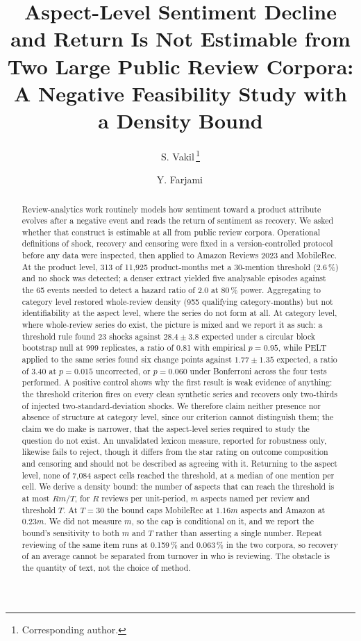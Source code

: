 \documentclass[11pt,a4paper]{article}
\title{Aspect-Level Sentiment Decline and Return Is Not Estimable from Two
Large Public Review Corpora: A Negative Feasibility Study with a Density Bound}
\author[1]{S. Vakil\,\orcidlink{0009-0009-1336-5045}\thanks{Corresponding author.}}
\author[1]{Y. Farjami\,\orcidlink{0000-0003-1908-8826}}
\affil[1]{Department of Computer Engineering, Faculty of Engineering,
University of Qom, Qom, Iran}
\date{}
\begin{document}
\maketitle

\begin{abstract}
\noindent
Review-analytics work routinely models how sentiment toward a product attribute
evolves after a negative event and reads the return of sentiment as recovery.
We asked whether that construct is estimable at all from public review corpora.
Operational definitions of shock, recovery and censoring were fixed in a
version-controlled protocol before any data were inspected, then applied to
Amazon Reviews 2023 and MobileRec. At the product level, 313 of 11{,}925
product-months met a 30-mention threshold (2.6\,\%) and no shock was detected;
a denser extract yielded five analysable episodes against the 65 events needed
to detect a hazard ratio of 2.0 at 80\,\% power. Aggregating to category level
restored whole-review density (955 qualifying category-months) but not
identifiability at the aspect level, where the series do not form at all. At
category level, where whole-review series do exist, the picture is mixed and we
report it as such: a threshold rule found 23 shocks against $28.4 \pm 3.8$
expected under a circular block bootstrap null at 999 replicates, a ratio of
0.81 with empirical $p = 0.95$, while PELT applied to the same series found six
change points against $1.77 \pm 1.35$ expected, a ratio of 3.40 at $p = 0.015$
uncorrected, or $p = 0.060$ under Bonferroni across the four tests performed. A
positive control shows why the first result is weak evidence of anything: the
threshold criterion fires on every clean synthetic series and recovers only
two-thirds of injected two-standard-deviation shocks. We therefore claim
neither presence nor absence of structure at category level, since our
criterion cannot distinguish them; the claim we do make is narrower, that the
aspect-level series required to study the question do not exist. An unvalidated lexicon measure, reported for
robustness only, likewise fails to reject, though it differs from the star
rating on outcome composition and censoring and should not be described as
agreeing with it. Returning to the aspect level, none of 7{,}084 aspect cells reached
the threshold, at a median of one mention per cell. We derive a density bound: the number of aspects that can reach the threshold
is at most $Rm/T$, for $R$ reviews per unit-period, $m$ aspects named per review
and threshold $T$. At $T = 30$ the bound caps MobileRec at $1.16m$ aspects and
Amazon at $0.23m$. We did not measure $m$, so the cap is conditional on it, and
we report the bound's sensitivity to both $m$ and $T$ rather than asserting a
single number. Repeat
reviewing of the same item runs at 0.159\,\% and 0.063\,\% in the two corpora,
so recovery of an average cannot be separated from turnover in who is
reviewing. The obstacle is the quantity of text, not the choice of method.
\end{abstract}
\end{document}
